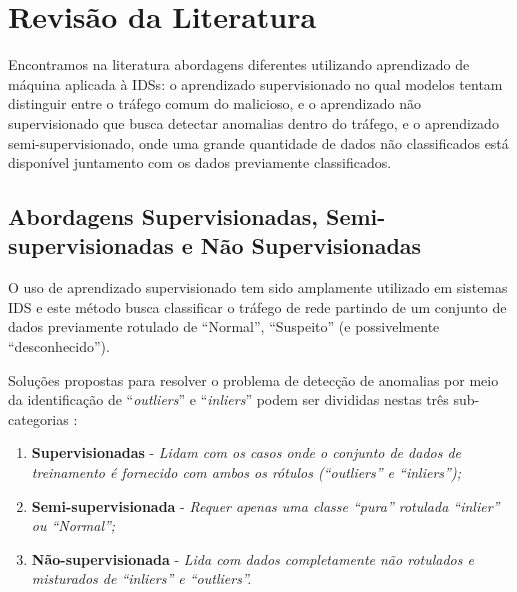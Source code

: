 \documentclass[twoside]{article}
\begin{document}
\section{Revisão da Literatura}

Encontramos na literatura abordagens diferentes utilizando aprendizado de máquina aplicada à \glspl{IDS}: o aprendizado supervisionado no qual modelos tentam distinguir entre o tráfego comum do malicioso, e o aprendizado não supervisionado que busca detectar anomalias dentro do tráfego, e o aprendizado semi-supervisionado, onde uma grande quantidade de dados não classificados está disponível juntamento com os dados previamente classificados. 

\subsection{Abordagens Supervisionadas, Semi-supervisionadas e Não Supervisionadas}

O uso de aprendizado supervisionado tem sido amplamente utilizado em sistemas \gls{IDS} \cite{he2017machine} e este método busca classificar o tráfego de rede partindo de um conjunto de dados previamente rotulado de ``Normal'', ``Suspeito'' (e possivelmente ``desconhecido'').

Soluções propostas para resolver o problema de detecção de anomalias por meio da identificação de ``\textit{outliers}'' e ``\textit{inliers}'' podem ser divididas nestas três sub-categorias \cite{aggarwal2016outlier}:

\begin{enumerate}
    \item \textbf{Supervisionadas} - \textit{Lidam com os casos onde o conjunto de dados de treinamento é fornecido com ambos os rótulos (``outliers'' e ``inliers'');}
    \item \textbf{Semi-supervisionada} - \textit{Requer apenas uma classe ``pura'' rotulada ``inlier'' ou ``Normal'';}
    \item \textbf{Não-supervisionada} - \textit{Lida com dados completamente não rotulados e misturados de ``inliers'' e ``outliers''.}
\end{enumerate}
\end{document}
